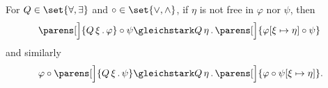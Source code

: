\begin{proposition}\label{thm:pulling_quantifiers_out}
  For \( Q \in \set{ \forall, \exists } \) and \( \bincirc \in \set{ \vee, \wedge } \), if \( \eta \) is not free in \( \varphi \) nor \( \psi \), then
  \begin{equation}\label{thm:pulling_quantifiers_out/first}
    \parens[\Big]{ \quantifier Q \xi \varphi } \bincirc \psi \gleichstark \quantifier Q \eta \parens[\Big]{ \varphi[\xi \mapsto \eta] \bincirc \psi }\phantom{.}
  \end{equation}
  and similarly
  \begin{equation}\label{thm:pulling_quantifiers_out/second}
    \varphi \bincirc \parens[\Big]{ \quantifier Q \xi \psi } \gleichstark \quantifier Q \eta \parens[\Big]{ \varphi \bincirc \psi[\xi \mapsto \eta] }.
  \end{equation}
\end{proposition}
